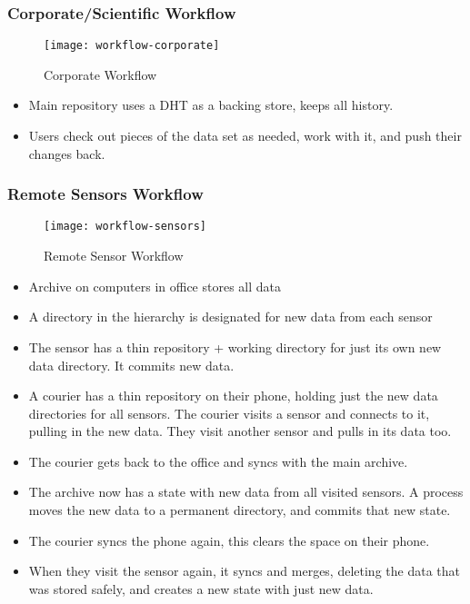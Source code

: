 \documentclass[a4paper]{article}
\begin{document}
\subsubsection{Corporate/Scientific Workflow}

  \begin{figure}[h]
    \caption{Corporate Workflow}
    \label{fig:workflow-corporate}
    \centering
      \texttt{[image: workflow-corporate]}
  \end{figure}

  \begin{itemize}
  \item
    Main repository uses a DHT as a backing store, keeps all history.
  \item
    Users check out pieces of the data set as needed, work with it, and
    push their changes back.
  \end{itemize}

\subsubsection{Remote Sensors Workflow}

  \begin{figure}[h]
    \caption{Remote Sensor Workflow}
    \label{fig:workflow-sensors}
    \centering
      \texttt{[image: workflow-sensors]}
  \end{figure}

  \begin{itemize}
  \item
    Archive on computers in office stores all data
  \item
    A directory in the hierarchy is designated for new data from each sensor
  \item
    The sensor has a thin repository + working directory for just its own new
    data directory. It commits new data.
  \item
    A courier has a thin repository on their phone, holding just the new data
    directories for all sensors. The courier visits a sensor and connects to it,
    pulling in the new data. They visit another sensor and pulls in its data
    too.
  \item
    The courier gets back to the office and syncs with the main archive.
  \item
    The archive now has a state with new data from all visited sensors. A
    process moves the new data to a permanent directory, and commits that new
    state.
  \item
    The courier syncs the phone again, this clears the space on their phone.
  \item
    When they visit the sensor again, it syncs and merges, deleting the data
    that was stored safely, and creates a new state with just new data.
  \end{itemize}
\end{document}
